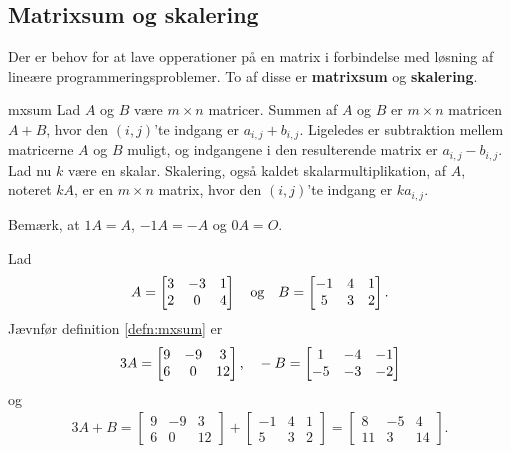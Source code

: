 \subsection{Matrixsum og skalering}
% 
Der er behov for at lave opperationer på en matrix i forbindelse med løsning af lineære programmeringsproblemer. 
To af disse er \textbf{matrixsum} og \textbf{skalering}.
%
\begin{defn}{}{mxsum}
Lad $A$ og $B$ være $m \times n$ matricer.
Summen af $A$ og $B$ er $m \times n$ matricen $A + B$, hvor den $(i,j)$'te indgang er $a_{i,j} + b_{i,j}$.
Ligeledes er subtraktion mellem matricerne $A$ og $B$ muligt, og indgangene i den resulterende matrix er $a_{i,j} - b_{i,j}$.
\\
Lad nu $k$ være en skalar.
Skalering, også kaldet skalarmultiplikation, af $A$, noteret $kA$, er en $m \times n$ matrix, hvor den $(i,j)$'te indgang er $ka_{i,j}$.
\end{defn}
\noindent
%
Bemærk, at $1A = A$, $-1A = -A$ og $0A = O$.
\\
%
\begin{eks}
Lad 
\begin{align*}
A= 
\begin{bmatrix}
3	&	-3	&	1\\
2	&	0	&	4
\end{bmatrix}
\text{\phantom{---}og\phantom{---}}
B= 
\begin{bmatrix}
-1	&	4	&	1\\
5	&	3	&	2
\end{bmatrix}.
\end{align*}
Jævnfør definition \ref{defn:mxsum} er
\begin{align*}
3A= 
\begin{bmatrix}
9	&	-9	&	3\\
6	&	0	&	12
\end{bmatrix}
\text{,\phantom{---}}
-B= 
\begin{bmatrix}
1	&	-4	&	-1\\
-5	&	-3	&	-2
\end{bmatrix}
\end{align*}
og
\begin{align*}
3A+B= 
\begin{bmatrix}
9	&	-9	&	3\\
6	&	0	&	12
\end{bmatrix}
+ 
\begin{bmatrix}
-1	&	4	&	1\\
5	&	3	&	2
\end{bmatrix}
=
\begin{bmatrix}
8	&	-5	&	4\\
11	&	3	&	14
\end{bmatrix}.
\end{align*}
\end{eks}
